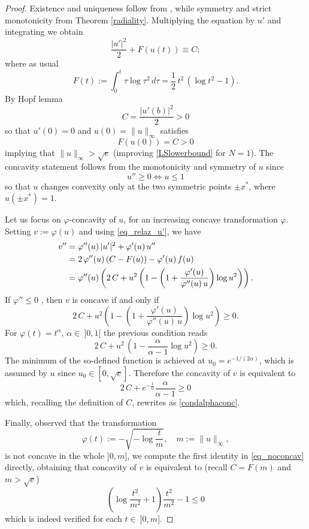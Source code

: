 \documentclass[12pt]{amsart}
\numberwithin{equation}{section}
\theoremstyle{plain}
\theoremstyle{plain}
\theoremstyle{plain}
\theoremstyle{definition}
\newcommand{\beq}{\begin{equation}}
\newcommand{\eeq}{\end{equation}}
\renewcommand{\le}{\leqslant}
\renewcommand{\ge}{\geqslant}
\begin{document}
\begin{proof}
Existence and uniqueness follow from \cite{SanUbil}, while symmetry and strict monotonicity from Theorem \ref{radiality}.
Multiplying the equation by $u'$ and integrating we obtain
\begin{equation}\label{eq_relaz_u'}
\frac{|u'|^2}{2}+F(u(t))\equiv C;
\end{equation}
where as usual
\beq
\label{defiF}
F(t):=\int_0^t \tau \log \tau^2\, d\tau = \frac{1}{2}\, t^2\, (\log t^2-1).
\eeq
By Hopf lemma 
\[
C=\frac{|u'(b)|^2}{2}>0
\]
so that $u'(0)=0$ and $u(0)=\|u\|_\infty$ satisfies
\[
F(u(0))=C>0
\]
implying that $\|u\|_\infty>\sqrt{e}$ (improving \eqref{LSlowerbound} for $N=1$).
The concavity statement follows from the monotonicity and symmetry of $u$ since
$$u'' \geq 0 \iff u \leq 1$$
so that $u$ changes convexity only at the two symmetric points $\pm x^*$, where $u(\pm x^*)=1$.

Let us focus on $\varphi$-concavity of $u$, for an increasing concave transformation $\varphi$. Setting $v:=\varphi(u)$ and using \eqref{eq_relaz_u'}, we have
\begin{align}
v''&=\varphi''(u)\, |u'|^2+\varphi'(u)\, u'' \notag\\ 
&=2\, \varphi''(u)\, (C-F(u)) -\varphi'(u)\, f(u) \label{eq_noconcav}\\
&=\varphi''(u)\left( 2\, C+u^2\left(1-\left(1+ \frac{\varphi'(u)}{\varphi''(u)\, u}\right) \log u^2\right)\right). \notag
\end{align}
If $\varphi''\le 0$ , then $v$ is concave if and only if 
\[
2\, C+u^2\left(1-\left(1+ \frac{\varphi'(u)}{\varphi''(u)\, u}\right) \log u^2\right)
\ge 0.
\]
For $\varphi(t)=t^\alpha$, $\alpha\in \ ]0, 1[$ the previous condition reads 
\[
2\, C+ u^2\,\left(1-\frac{\alpha}{\alpha-1} \log u^2\right) \ge 0.
\]
The minimum of the so-defined function is achieved at $u_{0}=e^{-1/(2\alpha)}$, which is assumed by $u$ since $u_{0}\in [0, \sqrt{e}]$. Therefore the concavity of $v$ is equivalent to 
\[
2\, C+ e^{-\frac{1}{\alpha}}\frac{\alpha}{\alpha-1}\ge 0
\]
which, recalling the definition of $C$, rewrites as \eqref{condalphaconc}.

Finally, observed that the transformation 
\[
\varphi(t):=-\sqrt{-\log \dfrac{t}{m}}, \quad m:=\|u\|_\infty,
\]
is not concave in the whole $]0,m]$, we compute the first identity in \eqref{eq_noconcav} directly, obtaining that concavity of $v$ is equivalent to (recall $C=F(m)$ and $m>\sqrt{e}$)
$$ \left(\log\frac{t^2}{m^2}+1\right)\frac{t^2}{m^2} - 1 \leq 0$$
which is indeed verified for each $t \in \ ]0,m]$.
\end{proof}
\end{document}
